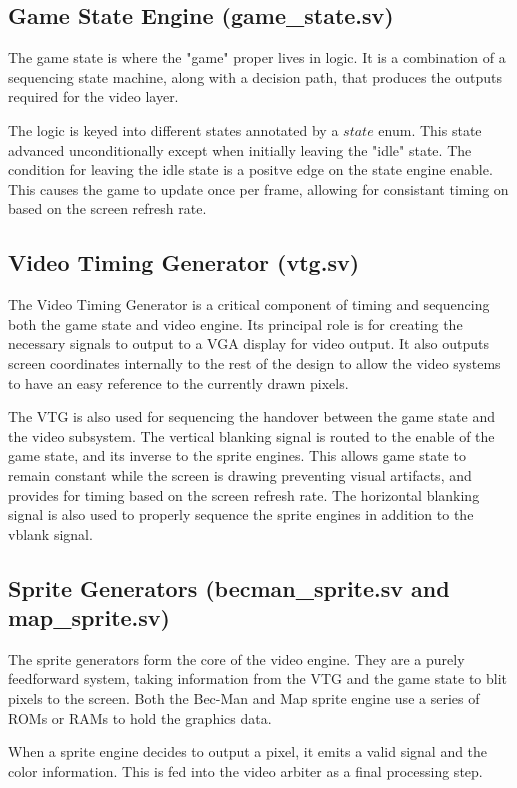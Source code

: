 \documentclass[12pt]{article}
\begin{document}
\subsection{Game State Engine (game\_state.sv)}
The game state is where the "game" proper lives in logic. It is a combination of
a sequencing state machine, along with a decision path, that produces the
outputs required for the video layer.

The logic is keyed into different states annotated by a $state$ enum. This state
advanced unconditionally except when initially leaving the "idle" state. The
condition for leaving the idle state is a positve edge on the state engine
enable. This causes the game to update once per frame, allowing for consistant
timing on based on the screen refresh rate.

\subsection{Video Timing Generator (vtg.sv)}
The Video Timing Generator is a critical component of timing and sequencing both the game state and
video engine. Its principal role is for creating the necessary signals to output
to a VGA display for video output. It also outputs screen coordinates internally
to the rest of the design to allow the video systems to have an easy reference 
to the currently drawn pixels.

The VTG is also used for sequencing the handover between the game state and the
video subsystem. The vertical blanking signal is routed to the enable of the
game state, and its inverse to the sprite engines. This allows game state to
remain constant while the screen is drawing preventing visual artifacts, and
provides for timing based on the screen refresh rate. The horizontal blanking
signal is also used to properly sequence the sprite engines in addition to the
vblank signal.

\subsection{Sprite Generators (becman\_sprite.sv and map\_sprite.sv)}
The sprite generators form the core of the video engine. They are a purely
feedforward system, taking information from the VTG and the game state to blit
pixels to the screen. Both the Bec-Man and Map sprite engine use a series of
ROMs or RAMs to hold the graphics data.

When a sprite engine decides to output a pixel, it emits a valid signal and the
color information. This is fed into the video arbiter as a final processing
step.
\end{document}
